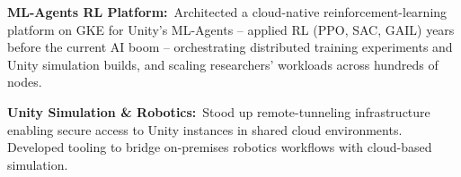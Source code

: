 \documentclass[11pt,letterpaper]{article}
\newcommand{\area}[2]{{\bfseries\color{accent}#1:}~#2}
\begin{document}
{%
\item \area{ML-Agents RL Platform}{Architected a cloud-native reinforcement-learning platform on GKE for Unity's ML-Agents -- applied RL (PPO, SAC, GAIL) years before the current AI boom -- orchestrating distributed training experiments and Unity simulation builds, and scaling researchers' workloads across hundreds of nodes.}
\item \area{Unity Simulation \& Robotics}{Stood up remote-tunneling infrastructure enabling secure access to Unity instances in shared cloud environments. Developed tooling to bridge on-premises robotics workflows with cloud-based simulation.}
}
\end{document}
